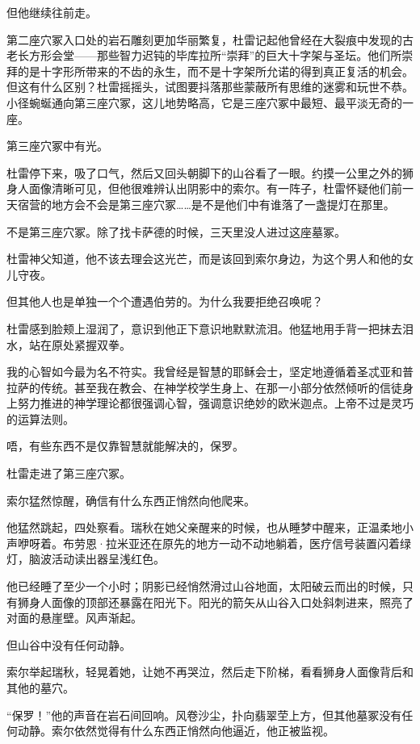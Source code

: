 \documentclass[AutoFakeBold=true]{book}
\begin{document}
但他继续往前走。

第二座穴冢入口处的岩石雕刻更加华丽繁复，杜雷记起他曾经在大裂痕中发现的古老长方形会堂——那些智力迟钝的毕库拉所``崇拜''的巨大十字架与圣坛。他们所崇拜的是十字形所带来的不齿的永生，而不是十字架所允诺的得到真正复活的机会。{\kaishu 但这有什么区别？}杜雷摇摇头，试图要抖落那些蒙蔽所有思维的迷雾和玩世不恭。小径蜿蜒通向第三座穴冢，这儿地势略高，它是三座穴冢中最短、最平淡无奇的一座。

第三座穴冢中有光。

杜雷停下来，吸了口气，然后又回头朝脚下的山谷看了一眼。约摸一公里之外的狮身人面像清晰可见，但他很难辨认出阴影中的索尔。有一阵子，杜雷怀疑他们前一天宿营的地方会不会是{\kaishu 第三座}穴冢……是不是他们中有谁落了一盏提灯在那里。

不是第三座穴冢。除了找卡萨德的时候，三天里没人进过这座墓冢。

杜雷神父知道，他不该去理会这光芒，而是该回到索尔身边，为这个男人和他的女儿守夜。

{\kaishu 但其他人也是单独一个个遭遇伯劳的。为什么我要拒绝召唤呢？}

杜雷感到脸颊上湿润了，意识到他正下意识地默默流泪。他猛地用手背一把抹去泪水，站在原处紧握双拳。

{\kaishu 我的心智如今最为名不符实。我曾经是智慧的耶稣会士，坚定地遵循着圣忒亚和普拉萨的传统。甚至我在教会、在神学校学生身上、在那一小部分依然倾听的信徒身上努力推进的神学理论都很强调心智，强调意识绝妙的欧米迦点。上帝不过是灵巧的运算法则。}

{\kaishu 唔，有些东西不是仅靠智慧就能解决的，保罗。}

杜雷走进了第三座穴冢。

\vspace*{1em}

索尔猛然惊醒，确信有什么东西正悄然向他爬来。

他猛然跳起，四处察看。瑞秋在她父亲醒来的时候，也从睡梦中醒来，正温柔地小声咿呀着。布劳恩·拉米亚还在原先的地方一动不动地躺着，医疗信号装置闪着绿灯，脑波活动读出器呈浅红色。

他已经睡了至少一个小时；阴影已经悄然滑过山谷地面，太阳破云而出的时候，只有狮身人面像的顶部还暴露在阳光下。阳光的箭矢从山谷入口处斜刺进来，照亮了对面的悬崖壁。风声渐起。

但山谷中没有任何动静。

索尔举起瑞秋，轻晃着她，让她不再哭泣，然后走下阶梯，看看狮身人面像背后和其他的墓穴。

``保罗！''他的声音在岩石间回响。风卷沙尘，扑向翡翠茔上方，但其他墓冢没有任何动静。索尔依然觉得有什么东西正悄然向他逼近，他正被监视。
\end{document}
